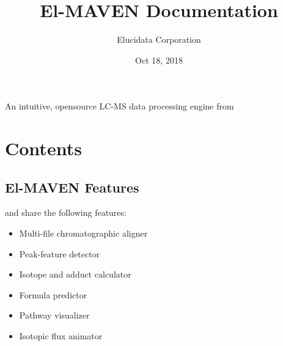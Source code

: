 \documentclass[letterpaper,10pt,english,openany,oneside]{sphinxmanual}
\title{El-MAVEN Documentation}
\date{Oct 18, 2018}
\author{Elucidata Corporation}
\begin{document}
\maketitle
\sphinxtableofcontents
{}\label{\detokenize{index::doc}}


An intuitive, opensource LC-MS data processing engine from
\begin{DUlineblock}{0em}
\item[] 
\end{DUlineblock}

\begin{DUlineblock}{0em}
\item[] 
\end{DUlineblock}


\chapter{Contents}
\label{\detokenize{index:contents}}

\section{El-MAVEN Features}
\label{\detokenize{ElMAVENFeatures:el-maven-features}}\label{\detokenize{ElMAVENFeatures::doc}}
 and  share the following features:
\begin{itemize}
\item {} 
Multi-file chromatographic aligner

\item {} 
Peak-feature detector

\item {} 
Isotope and adduct calculator

\item {} 
Formula predictor

\item {} 
Pathway visualizer

\item {} 
Isotopic flux animator

\end{itemize}
\end{document}
